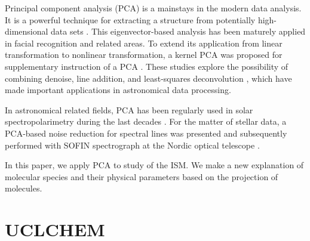 \documentclass{aa}
\begin{document}
\begin{CJK*}{UTF8}{gbsn}
    Principal component analysis (PCA) is a mainstays in the modern data analysis. It is a powerful technique for extracting a structure from potentially high-dimensional data sets \citep{kim2002face}. This eigenvector-based analysis has been maturely applied in facial recognition \citep{turk1991eigenfaces,zhang1997face} and related areas. To extend its application from linear transformation to nonlinear transformation, a kernel PCA was proposed for supplementary instruction of a PCA \citep{scholkopf1998nonlinear,muller2001introduction,scholkopf1997kernel}. These studies explore the possibility of combining denoise, line addition, and least-squares deconvolution \citep{paletou2012critical}, which have made important applications in astronomical data processing.
    
    In astronomical related fields, PCA has been regularly used in solar spectropolarimetry \citep{skumanich2002physical} during the last decades \citep{rees2000fast}. For the matter of stellar data, a PCA-based noise reduction for spectral lines was presented \citep{martinez2008pca} and subsequently performed with SOFIN spectrograph at the Nordic optical telescope \citep{herbig2003high}.
    
    In this paper, we apply PCA to study of the ISM. We make a new explanation of molecular species and their physical parameters based on the projection of molecules.


\section{UCLCHEM}

   

\end{CJK*}
\end{document}
